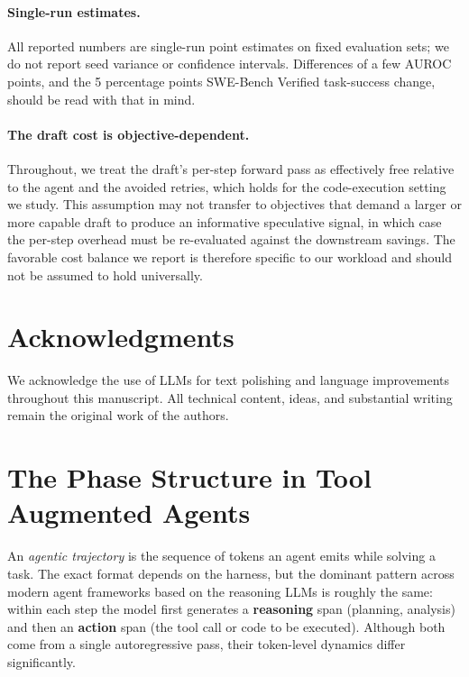 \documentclass[11pt]{article}
\begin{document}
\paragraph{Single-run estimates.} All reported numbers are single-run point estimates on fixed evaluation sets; we do not report seed variance or confidence intervals. Differences of a few AUROC points, and the 5 percentage points SWE-Bench Verified task-success change, should be read with that in mind.

\paragraph{The draft cost is objective-dependent.}
Throughout, we treat the draft's per-step forward pass as effectively free
relative to the agent and the avoided retries, which holds for the code-execution
setting we study. This assumption may not transfer to objectives that demand a
larger or more capable draft to produce an informative speculative signal, in
which case the per-step overhead must be re-evaluated against the downstream
savings. The favorable cost balance we report is therefore specific to our
workload and should not be assumed to hold universally.

\section*{Acknowledgments}

We acknowledge the use of LLMs for text polishing and language improvements throughout this manuscript. All technical content, ideas, and substantial writing remain the original work of the authors.



\appendix

\newpage
\section{The Phase Structure in Tool Augmented Agents}
\label{app:dynamics}

An \emph{agentic trajectory}
is the sequence of tokens an agent emits while solving a task. The exact format depends on the
harness, but the dominant pattern across modern agent frameworks based on the reasoning LLMs is roughly the same: within each step
the model first generates a \textbf{reasoning} span (planning, analysis) and then an
\textbf{action} span (the tool call or code to be executed). Although both come from a single
autoregressive pass, their token-level dynamics differ significantly.
\end{document}
